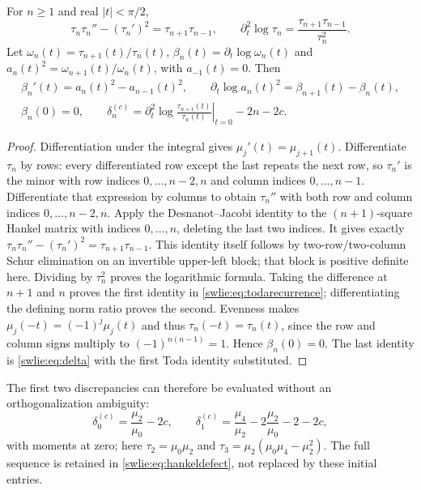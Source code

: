 \begin{swlietheorem}\label{swlie:thm:toda}
For $n\geq1$ and real $|t|<\pi/2$,
\begin{equation}\label{swlie:eq:toda}
 \tau_n\tau_n''-(\tau_n')^2=\tau_{n+1}\tau_{n-1},
 \qquad \partial_t^2\log\tau_n
                    =\frac{\tau_{n+1}\tau_{n-1}}{\tau_n^2}.
\end{equation}
Let $\omega_n(t)=\tau_{n+1}(t)/\tau_n(t)$,
$\beta_n(t)=\partial_t\log\omega_n(t)$ and
$a_n(t)^2=\omega_{n+1}(t)/\omega_n(t)$, with $a_{-1}(t)=0$.
Then
\begin{equation}\label{swlie:eq:todarecurrence}
 \begin{gathered}
 \beta_n'(t)=a_n(t)^2-a_{n-1}(t)^2,\qquad
 \partial_t\log a_n(t)^2=\beta_{n+1}(t)-\beta_n(t),\\
 \beta_n(0)=0,\qquad
 \delta_n^{(c)}
   =\left.\partial_t^2\log\frac{\tau_{n+1}(t)}{\tau_n(t)}
                                               \right|_{t=0}-2n-2c .
 \end{gathered}
\end{equation}
\end{swlietheorem}
\begin{proof}
Differentiation under the integral gives
$\mu_j'(t)=\mu_{j+1}(t)$. Differentiate $\tau_n$ by rows:
every differentiated row except the last repeats the next
row, so $\tau_n'$ is the minor with row indices
$0,\ldots,n-2,n$ and column indices $0,\ldots,n-1$.
Differentiate that expression by columns to obtain
$\tau_n''$ with both row and column indices
$0,\ldots,n-2,n$. Apply the Desnanot--Jacobi identity
to the $(n+1)$-square Hankel matrix with indices $0,\ldots,n$,
deleting the last two indices. It gives exactly
$\tau_n\tau_n''-(\tau_n')^2=\tau_{n+1}\tau_{n-1}$.
This identity itself follows by two-row/two-column
Schur elimination on an invertible upper-left block;
that block is positive definite here. Dividing by
$\tau_n^2$ proves the logarithmic formula.
Taking the difference at $n+1$ and $n$ proves the first
identity in \eqref{swlie:eq:todarecurrence}; differentiating
the defining norm ratio proves the second.
Evenness makes $\mu_j(-t)=(-1)^j\mu_j(t)$ and thus
$\tau_n(-t)=\tau_n(t)$, since the row and column signs
multiply to $(-1)^{n(n-1)}=1$. Hence $\beta_n(0)=0$.
The last identity is \eqref{swlie:eq:delta} with the first
Toda identity substituted.
\end{proof}

The first two discrepancies can therefore be evaluated
without an orthogonalization ambiguity:
\[
 \delta_0^{(c)}=\frac{\mu_2}{\mu_0}-2c,\qquad
 \delta_1^{(c)}=\frac{\mu_4}{\mu_2}
              -2\frac{\mu_2}{\mu_0}-2-2c,
\]
with moments at zero; here
$\tau_2=\mu_0\mu_2$ and
$\tau_3=\mu_2(\mu_0\mu_4-\mu_2^2)$.
The full sequence is retained in \eqref{swlie:eq:hankeldefect},
not replaced by these initial entries.

